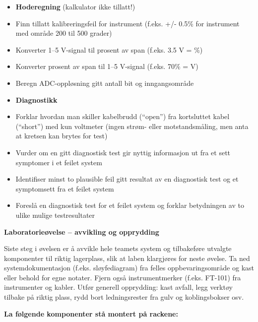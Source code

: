 \begin{itemize}
\item{} {\bf Hoderegning} (kalkulator ikke tillatt!)
\item{} Finn tillatt kalibreringsfeil for instrument (f.eks. +/- 0.5\% for instrument med område 200 til 500 grader)
\item{} Konverter 1--5 V-signal til prosent av span (f.eks. 3.5 V = \underbar{\hskip 20pt}\%)
\item{} Konverter prosent av span til 1--5 V-signal (f.eks. 70\% = \underbar{\hskip 20pt} V)
\item{} Beregn ADC-oppløsning gitt antall bit og inngangsområde
\end{itemize}

\filbreak

\begin{itemize}
\item{} {\bf Diagnostikk}
\item{} Forklar hvordan man skiller kabelbrudd (``open'') fra kortsluttet kabel (``short'') med kun voltmeter (ingen strøm- eller motstandsmåling, men anta at kretsen kan brytes for test)
\item{} Vurder om en gitt diagnostisk test gir nyttig informasjon ut fra et sett symptomer i et feilet system
\item{} Identifiser minst to plausible feil gitt resultat av en diagnostisk test og et symptomsett fra et feilet system
\item{} Foreslå en diagnostisk test for et feilet system og forklar betydningen av to ulike mulige testresultater
\end{itemize}



\vfil \eject

\noindent
{\bf Laboratorieøvelse -- avvikling og opprydding}

\vskip 5pt

Siste steg i øvelsen er å avvikle hele teamets system og tilbakeføre utvalgte komponenter til riktig lagerplass, slik at laben klargjøres for neste øvelse. Ta ned systemdokumentasjon (f.eks. sløyfediagram) fra felles oppbevaringsområde og kast eller behold for egne notater. Fjern også instrumentmerker (f.eks. FT-101) fra instrumenter og kabler. Utfør generell opprydding: kast avfall, legg verktøy tilbake på riktig plass, rydd bort ledningsrester fra gulv og koblingsbokser osv.

\vskip 10pt

\indent
{\bf La følgende komponenter stå montert på rackene:}


